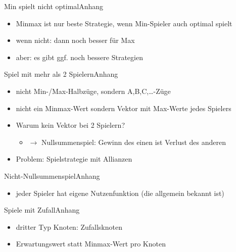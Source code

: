 \documentclass[18pt, aspectratio=169, handout]{beamer}
\begin{document}
\begin{frame}{Min spielt nicht optimal}{Anhang}
  \begin{itemize}
  \item
    Minmax ist nur beste Strategie, wenn Min-Spieler auch optimal spielt
  \item
    wenn nicht: dann noch besser für Max
  \item
    aber: es gibt ggf. noch bessere Strategien
  \end{itemize}
\end{frame}

\begin{frame}{Spiel mit mehr als 2 Spielern}{Anhang}
  \begin{itemize}
  \item
    nicht Min-/Max-Halbzüge, sondern A,B,C,\dots-Züge
  \item
    nicht ein Minmax-Wert sondern Vektor mit Max-Werte jedes Spielers
  \item
    Warum kein Vektor bei 2 Spielern?
    \begin{itemize}
    \item
      $\rightarrow$ Nullsummenspiel: Gewinn des einen ist Verlust des anderen
    \end{itemize}
  \item
    Problem: Spielstrategie mit Allianzen
  \end{itemize}
\end{frame}

\begin{frame}{Nicht-Nullsummenspiel}{Anhang}
  \begin{itemize}
  \item
    jeder Spieler hat eigene Nutzenfunktion (die allgemein bekannt ist)
  \end{itemize}
\end{frame}


\begin{frame}{Spiele mit Zufall}{Anhang}
  \begin{itemize}
  \item
    dritter Typ Knoten: Zufallsknoten
  \item
    Erwartungswert statt Minmax-Wert pro Knoten
  \end{itemize}
\end{frame}
\end{document}
